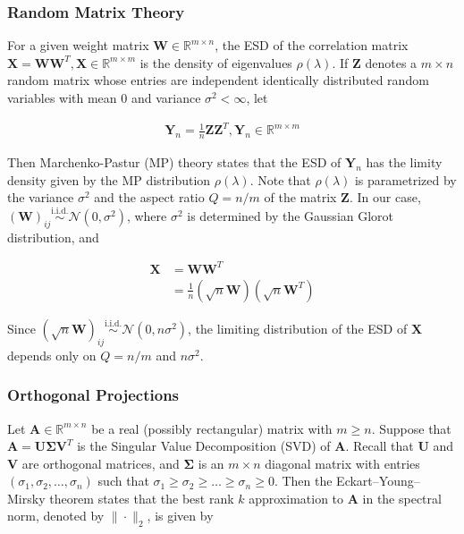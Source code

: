 \subsubsection*{Random Matrix Theory}
For a given weight matrix $\mathbf{W} \in \mathbb{R}^{m \times n}$, the ESD of the correlation matrix $\mathbf{X} = \mathbf{W}\mathbf{W}^T, \mathbf{X} \in \mathbb{R}^{m \times m}$ is the density of eigenvalues $\rho(\lambda)$. If $\textbf{Z}$ denotes a $m \times n$ random matrix whose entries are independent identically distributed random variables with mean 0 and variance $\sigma^2 < \infty$, let

\begin{align*}
 \mathbf{Y}_n  = \frac{1}{n} \mathbf{Z} \mathbf{Z}^T, \mathbf{Y}_n \in \mathbb{R}^{m \times m}
\end{align*}

Then Marchenko-Pastur (MP) theory states that the ESD of $\mathbf{Y}_n$ has the limity density given by the MP distribution $\rho(\lambda)$. Note that $\rho(\lambda)$ is parametrized by the variance $\sigma^2$ and the aspect ratio $Q = n/m$ of the matrix $\mathbf{Z}$. In our case, $(\textbf{W})_{ij} \overset{\text{i.i.d.}}{\sim} \mathcal{N}(0, \sigma^2)$, where $\sigma^2$ is determined by the Gaussian Glorot distribution, and

\begin{align*}
 \mathbf{X} &= \mathbf{W}\mathbf{W}^T \\
 & = \frac{1}{n} (\sqrt{n}\mathbf{W})(\sqrt{n}\mathbf{W}^T)
\end{align*}

Since $(\sqrt{n}\mathbf{W})_{ij} \overset{\text{i.i.d.}}{\sim} \mathcal{N}(0, n\sigma^2)$, the limiting distribution of the ESD of $\mathbf{X}$ depends only on $Q = n/m$ and $n\sigma^2$.

\subsubsection*{Orthogonal Projections}
Let $\mathbf{A} \in \mathbb{R}^{m \times n}$ be a real (possibly rectangular) matrix with $m \geq n$. Suppose that $\mathbf{A} = \mathbf{U}\mathbf{\Sigma}\mathbf{V}^T$ is the Singular Value Decomposition (SVD) of $\mathbf{A}$. Recall that $\mathbf{U}$ and $\mathbf{V}$ are orthogonal matrices, and $\mathbf{\Sigma}$ is an $m \times n$ diagonal matrix with entries $(\sigma_1, \sigma_2, \dots, \sigma_n)$ such that $\sigma_1 \geq \sigma_2 \geq \dots \geq \sigma_n \geq 0$. Then the Eckart–Young–Mirsky theorem states that the best rank $k$ approximation to $\mathbf{A}$ in the spectral norm, denoted by $\|\cdot\|_2$, is given by

